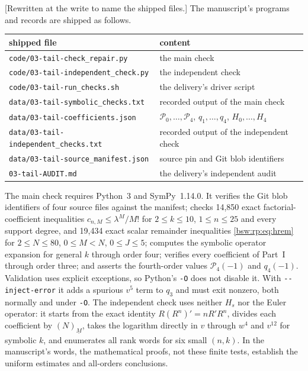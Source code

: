 \documentclass[11pt,letterpaper]{article}
\theoremstyle{definition}
\theoremstyle{remark}
\newcommand{\fall}[2]{(#1)_{\underline{#2}}}
\begin{document}
[Rewritten at the write to name the shipped files.]  The manuscript's
programs and records are shipped as follows.
\begin{center}\small
\begin{tabular}{ll}
\toprule
shipped file & content\\
\midrule
\texttt{code/03-tail-check\_repair.py} & the main check\\
\texttt{code/03-tail-independent\_check.py} & the independent check\\
\texttt{code/03-tail-run\_checks.sh} & the delivery's driver script\\
\texttt{data/03-tail-symbolic\_checks.txt} & recorded output of the main check\\
\texttt{data/03-tail-coefficients.json} & $\mathcal P_0,\ldots,\mathcal P_4$,
 $q_1,\ldots,q_4$, $H_0,\ldots,H_4$\\
\texttt{data/03-tail-independent\_checks.txt} & recorded output of the
 independent check\\
\texttt{data/03-tail-source\_manifest.json} & source pin and Git blob
 identifiers\\
\texttt{03-tail-AUDIT.md} & the delivery's independent audit\\
\bottomrule
\end{tabular}
\end{center}

The main check requires Python~3 and SymPy~1.14.0.  It verifies the Git
blob identifiers of four source files against the manifest; checks 14,850
exact factorial-coefficient inequalities $c_{n,M}\le\lambda^M/M!$ for
$2\le k\le10$, $1\le n\le25$ and every support degree, and 19,434 exact
scalar remainder inequalities \eqref{bsw:rp:eq:hrem} for $2\le N\le80$,
$0\le M<N$, $0\le J\le5$; computes the symbolic operator expansion for
general $k$ through order four; verifies every coefficient of Part~I
through order three; and asserts the fourth-order values
$\mathcal P_4(-1)$ and $q_4(-1)$.  Validation uses explicit exceptions, so
Python's \texttt{-O} does not disable it.  With
\texttt{-{}-inject-error} it adds a spurious $v^5$ term to $q_3$ and must
exit nonzero, both normally and under \texttt{-O}.  The independent check
uses neither $H_s$ nor the Euler operator: it starts from the exact
identity $R(R^n)'=nR'R^n$, divides each coefficient by $\fall NM$, takes
the logarithm directly in $v$ through $w^4$ and $v^{12}$ for symbolic $k$,
and enumerates all rank words for six small $(n,k)$.  In the manuscript's
words, the mathematical proofs, not these finite tests, establish the
uniform estimates and all-orders conclusions.
\end{document}
